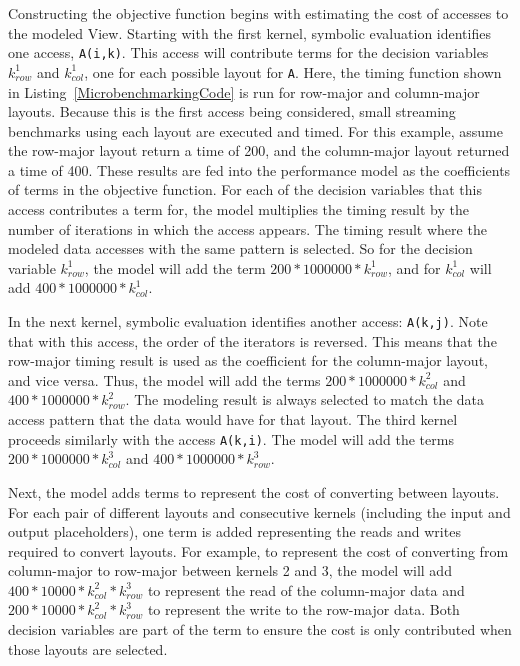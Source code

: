 Constructing the objective function begins with estimating the cost of accesses to the modeled View.
Starting with the first kernel, symbolic evaluation identifies one access, \verb.A(i,k)..
This access will contribute terms for the decision variables $k_{row}^1$ and $k_{col}^1$, one for each possible layout for \verb.A..
Here, the timing function shown in Listing~\ref{MicrobenchmarkingCode} is run for row-major and column-major layouts.
Because this is the first access being considered, small streaming benchmarks using each layout are executed and timed. 
For this example, assume the row-major layout return a time of 200, and the column-major layout returned a time of 400.
These results are fed into the performance model as the coefficients of terms in the objective function.
For each of the decision variables that this access contributes a term for, the model multiplies the timing result by the number of iterations in which the access appears. 
The timing result where the modeled data accesses with the same pattern is selected.
So for the decision variable $k_{row}^1$, the model will add the term $200 * 1000000 * k_{row}^1$, and for $k_{col}^1$ will add $400 * 1000000 * k_{col}^1$.

In the next kernel, symbolic evaluation identifies another access: \verb.A(k,j)..
Note that with this access, the order of the iterators is reversed. 
This means that the row-major timing result is used as the coefficient for the column-major layout, and vice versa.
Thus, the model will add the terms $200 * 1000000 * k_{col}^2$ and $400 * 1000000 * k_{row}^2$.
The modeling result is always selected to match the data access pattern that the data would have for that layout.
The third kernel proceeds similarly with the access \verb.A(k,i)..
The model will add the terms $200 * 1000000 * k_{col}^3$ and $400 * 1000000 * k_{row}^3$.

Next, the model adds terms to represent the cost of converting between layouts. 
For each pair of different layouts and consecutive kernels (including the input and output placeholders), one term is added representing the reads and writes required to convert layouts.
For example, to represent the cost of converting from column-major to row-major between kernels 2 and 3, the model will add $400 * 10000 * k_{col}^2 * k_{row}^3$ to represent the read of the column-major data and $200 * 10000 * k_{col}^2 * k_{row}^3$ to represent the write to the row-major data.
Both decision variables are part of the term to ensure the cost is only contributed when those layouts are selected.

